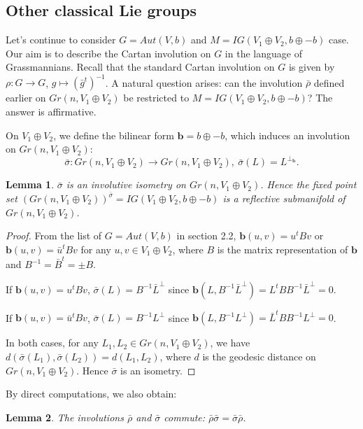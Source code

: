 \documentclass{article}
\newtheorem{lem}{Lemma}[section]
\begin{document}
\subsection{Other classical Lie groups}
Let's continue to consider $G=Aut(V,b)$ and $M=IG(V_1 \oplus V_2, b\oplus-b)$ case. Our aim is to describe the Cartan involution on
$G$ in the language of Grassmannians. Recall
that the standard Cartan involution on $G$ is given by $\rho: G \rightarrow G$, $g \mapsto (\bar{g}^t)^{-1}$.
A natural question arises: can the involution
$\bar{\rho}$ defined earlier on $Gr(n, V_1 \oplus V_2)$ be restricted to $M=IG(V_1 \oplus V_2, b\oplus-b)$?
The answer is affirmative.

On $V_1 \oplus V_2$, we define the bilinear form $\mathbf{b}=b\oplus-b$, which induces an involution on $Gr(n, V_1\oplus V_2)$:
\[
\bar{\sigma}: Gr(n, V_1\oplus V_2) \rightarrow Gr(n, V_1\oplus V_2), ~  \bar{\sigma}(L)=L^{\bot_{\mathbf{b}}}.
\]

\begin{lem}
$\bar{\sigma}$ is an involutive isometry on $Gr(n, V_1\oplus V_2)$.
Hence the fixed point set $(Gr(n, V_1\oplus V_2))^{\bar{\sigma}}=IG(V_1 \oplus V_2, b\oplus-b)$  is a reflective submanifold of  $Gr(n, V_1\oplus V_2)$.
\end{lem}
\begin{proof}
From the list of $G=Aut(V,b)$ in section 2.2,  $\mathbf{b}(u,v)=u^t B v$ or $\mathbf{b}(u,v)=\bar{u}^t B v$ for any $u,v \in V_1\oplus V_2$,  where $B$ is the matrix representation of $\mathbf{b}$ and $B^{-1}=\bar{B}^t=\pm B$.

If $\mathbf{b}(u,v)=u^t B v$,
$\bar{\sigma}(L)=B^{-1}\bar{L}^{\perp}$ since $\mathbf{b}(L,B^{-1}\bar{L}^{\perp})=L^t B B^{-1} \bar{L}^{\perp}=0$.

If $\mathbf{b}(u,v)=\bar{u}^t B v$,
$\bar{\sigma}(L)=B^{-1}L^{\perp}$ since $\mathbf{b}(L,B^{-1}L^{\perp})=\bar{L}^tBB^{-1}L^{\perp}=0$.

In both cases, for any $L_1, L_2 \in Gr(n, V_1\oplus V_2)$, we have $d(\bar{\sigma}(L_1), \bar{\sigma}(L_2))=d(L_1, L_2)$, where $d$ is the geodesic distance on $Gr(n, V_1\oplus V_2)$. Hence $\bar{\sigma}$ is an isometry.
\end{proof}

By direct computations, we also obtain:
\begin{lem}
The involutions $\bar{\rho}$ and $\bar{\sigma}$ commute: $\bar{\rho}\bar{\sigma}=\bar{\sigma}\bar{\rho}$.
\end{lem}
\end{document}
